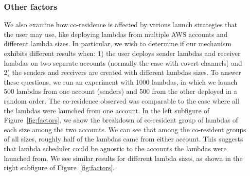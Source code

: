 \subsubsection{Other factors}
We also examine how co-residence is affected by various launch strategies that
the user may use, like deploying lambdas from multiple AWS accounts and
different lambda sizes. In particular, we wish to determine if our mechanism
exhibits different results when: 1) the user deploys sender lambdas and receiver
lambdas on two separate accounts (normally the case with covert channels) and 2)
the senders and receivers are created with different lambdas sizes.  To answer
these questions, we run an experiment with 1000 lambdas, in which we launch 500
lambdas from one account (senders) and 500 from the other deployed in a random
order. The co-residence observed was comparable to the case where all the
lambdas were launched from one account. In the left subfigure of
Figure~\ref{fig:factors}, we show the breakdown of co-resident group of lambdas
of each size among the two accounts.  We can see that among the co-resident
groups of all sizes, roughly half of the lambdas came from either account. This suggests 
that lambda scheduler could be agnostic to the accounts the lambdas were launched
from. We see similar results for different lambda sizes, as shown in the right
subfigure of Figure~\ref{fig:factors}.

